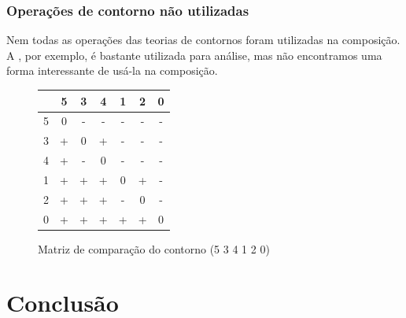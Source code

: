 \subsection{Operações de contorno não utilizadas}
\label{sec:oper-de-cont}

Nem todas as operações das teorias de contornos foram utilizadas na
composição. A , por exemplo, é bastante utilizada para
análise, mas não encontramos uma forma interessante de usá-la na
composição.

\begin{figure}
  \centering
  \begin{tabular}{r|cccccc}
      & 5 & 3 & 4 & 1 & 2 & 0 \\
      \hline
    5 & 0 & - & - & - & - & - \\
    3 & + & 0 & + & - & - & - \\
    4 & + & - & 0 & - & - & - \\
    1 & + & + & + & 0 & + & - \\
    2 & + & + & + & - & 0 & - \\
    0 & + & + & + & + & + & 0
  \end{tabular}
  \caption{Matriz de comparação do contorno (5 3 4 1 2 0)}
  \label{fig:matriz-534120}
\end{figure}


\chapter{Conclusão}
\label{cha:conclusao}
